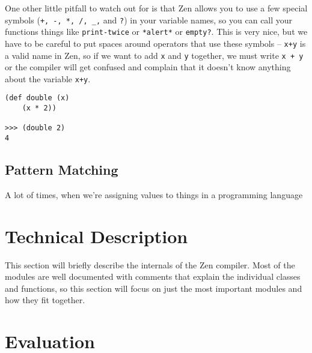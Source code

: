 \documentclass{article}
\begin{document}
One other little pitfall to watch out for is that Zen allows you to use a few special symbols (\lstinline{+, -, *, /, _,} and \lstinline{?}) in your variable names, so you can call your functions things like \lstinline{print-twice} or \lstinline{*alert*} or \lstinline{empty?}. This is very nice, but we have to be careful to put spaces around operators that use these symbols -- \lstinline{x+y} is a valid name in Zen, so if we want to add \lstinline{x} and \lstinline{y} together, we must write \lstinline{x + y} or the compiler will get confused and complain that it doesn't know anything about the variable \lstinline{x+y}.

\begin{lstlisting}
(def double (x)
	(x * 2))
	
>>> (double 2)
4
\end{lstlisting}


\subsection{Pattern Matching}
A lot of times, when we're assigning values to things in a programming language



\section{Technical Description}

This section will briefly describe the internals of the Zen compiler. Most of the modules are well documented with comments that explain the individual classes and functions, so this section will focus on just the most important modules and how they fit together.



\section{Evaluation}
\end{document}
